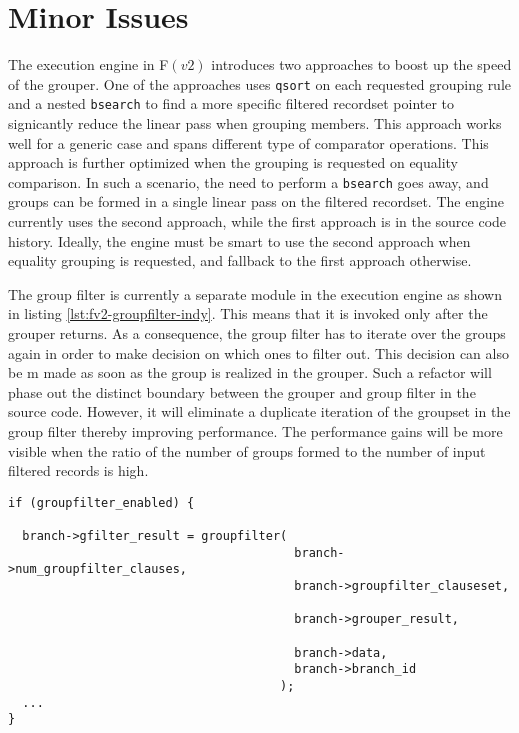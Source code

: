 \section{Minor Issues}\label{sec:minor-issues}




The execution engine in F$(v2)$ introduces two approaches to boost up the speed
of the grouper. One of the approaches uses \texttt{qsort} on each requested
grouping rule and a nested \texttt{bsearch} to find a more specific filtered
recordset pointer to signicantly reduce the linear pass when grouping members.
This approach works well for a generic case and spans different type of
comparator operations. This approach is further optimized when the grouping is
requested on equality comparison. In such a scenario, the
 need to
perform a \texttt{bsearch} goes away, and groups can be formed in a single
linear pass on the filtered recordset. The engine currently uses the second
approach, while the first approach is in the source code history. Ideally, the
engine must be smart to use the second approach when equality grouping is
requested, and fallback to the first approach otherwise.




The group filter is currently a separate module in the execution engine as
shown in listing \ref{lst:fv2-groupfilter-indy}. This means that it is invoked
only after the grouper returns. As a consequence, the group filter has to
iterate over the groups again in order to make decision on which ones to filter
out. This decision can also be m made as soon as
the group is realized in the grouper. Such a refactor will phase out the
distinct boundary between the grouper and group filter in the source code.
However, it will eliminate a duplicate iteration of the groupset in the group
filter thereby improving performance. The performance gains will be more
visible when the ratio of the number of groups formed to the number of input
filtered records is high.

\begin{lstlisting}
if (groupfilter_enabled) {

  branch->gfilter_result = groupfilter(
                                        branch->num_groupfilter_clauses,
                                        branch->groupfilter_clauseset,

                                        branch->grouper_result,

                                        branch->data,
                                        branch->branch_id
                                      );
  ...
}
\end{lstlisting}

